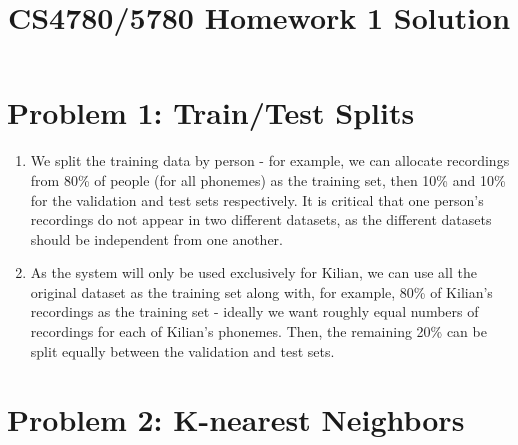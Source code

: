 \documentclass[11pt]{article}
\title{CS4780/5780 Homework 1 Solution}
\author{}
\date{}
\begin{document}
    \maketitle

    \section*{Problem 1: Train/Test Splits}

    \begin{enumerate}

        \item We split the training data by person - for example, we can allocate recordings from 80\% of people (for all phonemes) as the training set, then 10\% and 10\% for the validation and test sets respectively. It is critical that one person's recordings do not appear in two different datasets, as the different datasets should be independent from one another.

        \item As the system will only be used exclusively for Kilian, we can use all the original dataset as the training set along with, for example, 80\% of Kilian's recordings as the training set - ideally we want roughly equal numbers of recordings for each of Kilian's phonemes. Then, the remaining 20\% can be split equally between the validation and test sets.

    \end{enumerate}

    \section*{Problem 2: K-nearest Neighbors}
\end{document}
